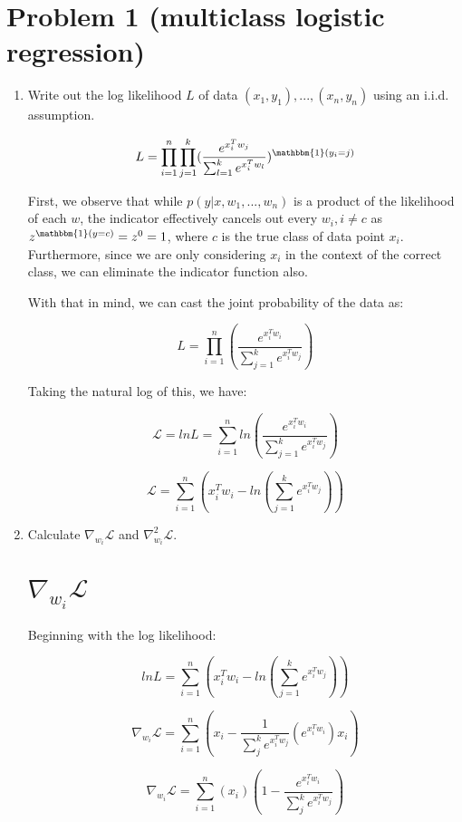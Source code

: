 \documentclass[11pt]{article}
\begin{document}

\section*{Problem 1 (multiclass logistic regression)}

\begin{enumerate}
\item Write out the log likelihood $L$ of data $(x_1, y_1), . . . , (x_n, y_n)$ using an i.i.d. assumption.

\[
L = \prod_{i=1}^{n} \prod_{j=1}^{k} (\frac{e^{x_i^Tw_j}}{\sum_{l=1}^k e^{x_i^Tw_l}})^{\mathbbm{1}(y_i = j)}
\]

First, we observe that while $p(y|x, w_1, ..., w_n)$ is a product of the likelihood of each $w$, the indicator effectively cancels out every $w_i, i \neq c$ as $z^{\mathbbm{1}(y = c)} = z^0 = 1$, where $c$ is the true class of data point $x_i$. Furthermore, since we are only considering $x_i$ in the context of the correct class, we can eliminate the indicator function also.

With that in mind, we can cast the joint probability of the data as:

\[
L = \prod_{i=1}^{n} (\frac{e^{x_i^Tw_i}}{\sum_{j=1}^k e^{x_i^Tw_j}})
\]

Taking the natural log of this, we have:

\[
\mathcal{L} = lnL = \sum_{i=1}^{n} ln(\frac{e^{x_i^Tw_i}}{\sum_{j=1}^k e^{x_i^Tw_j}})
\]

\[
\mathcal{L} = \sum_{i=1}^{n} (x_i^Tw_i - ln({\sum_{j=1}^k e^{x_i^Tw_j}}))
\]

\item Calculate $\nabla_{w_i} \mathcal{L}$ and $\nabla^2_{w_i} \mathcal{L}$.

\section*{$\nabla_{w_i} \mathcal{L}$}

Beginning with the log likelihood:

\[
lnL = \sum_{i=1}^{n} (x_i^Tw_i - ln({\sum_{j=1}^k e^{x_i^Tw_j}}))
\]

\[
\nabla_{w_i}\mathcal{L} = \sum_{i=1}^{n} (x_i - \frac{1}{\sum_j^k e^{x_i^Tw_j}} (e^{x_i^Tw_i}) x_i)
\]

\[
\nabla_{w_i}\mathcal{L} = \sum_{i=1}^{n}(x_i) (1 - \frac{e^{x_i^Tw_i}}{\sum_j^k e^{x_i^Tw_j}})
\]


\end{enumerate}
\end{document}
